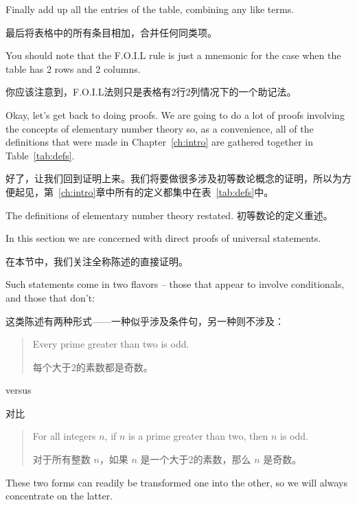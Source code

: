 Finally add up all the entries of the table, combining any like terms.

最后将表格中的所有条目相加，合并任何同类项。

You should note that the F.O.I.L rule is just a mnemonic for the case when
the table has 2 rows and 2 columns.

你应该注意到，F.O.I.L法则只是表格有2行2列情况下的一个助记法。

Okay, let's get back to doing proofs.  We are going to do a lot of
proofs involving the concepts of elementary number theory so, as a
convenience, all of the definitions that were made in Chapter~\ref{ch:intro}
are gathered together in Table~\ref{tab:defs}.

好了，让我们回到证明上来。我们将要做很多涉及初等数论概念的证明，所以为方便起见，第~\ref{ch:intro}章中所有的定义都集中在表~\ref{tab:defs}中。

\begin{table}[hbt]
      
      \caption{The definitions of elementary number theory restated. 初等数论的定义重述。}
      \label{tab:defs}
\end{table}

\clearpage

In this section we are concerned with
direct proofs of universal statements.

在本节中，我们关注全称陈述的直接证明。

Such statements come in two flavors -- those that appear to involve
conditionals, and those that don't:

这类陈述有两种形式——一种似乎涉及条件句，另一种则不涉及：

\begin{quote} Every prime greater than two is odd.

      每个大于2的素数都是奇数。
\end{quote}

versus

对比

\begin{quote} For all integers $n$, if $n$ is a prime greater than two, then $n$ is odd.

      对于所有整数 $n$，如果 $n$ 是一个大于2的素数，那么 $n$ 是奇数。
\end{quote}

These two forms can readily be transformed one into the other, so
we will always concentrate on the latter.

